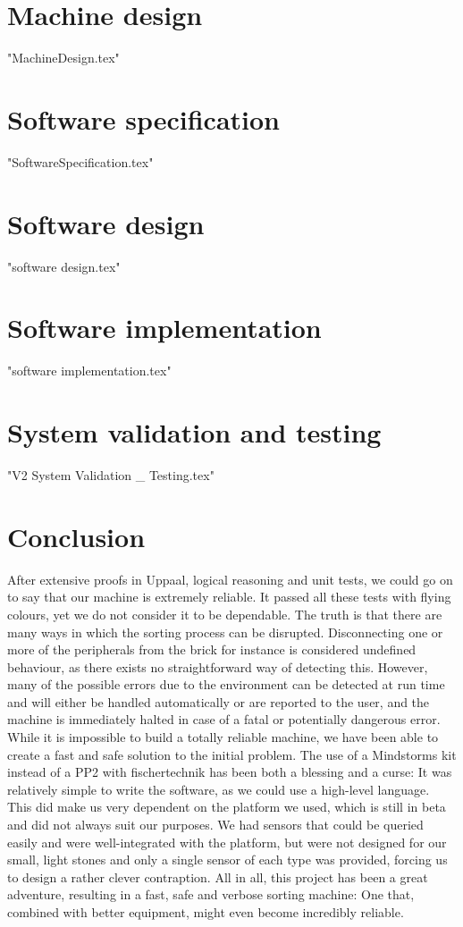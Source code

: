 \documentclass[a4paper,oneside,11pt]{report}
\begin{document}
\chapter{Machine design}
{"MachineDesign.tex"} 

\chapter{Software specification}
{"SoftwareSpecification.tex"}

\chapter{Software design}
{"software design.tex"}

\chapter{Software implementation}
{"software implementation.tex"} 

\chapter{System validation and testing}
{"V2 System Validation _ Testing.tex"}

\chapter{Conclusion}
After extensive proofs in Uppaal, logical reasoning and unit tests, we could go on to say that our machine is extremely reliable. It passed all these tests with flying colours, yet we do not consider it to be dependable. The truth is that there are many ways in which the sorting process can be disrupted. Disconnecting one or more of the peripherals from the brick for instance is considered undefined behaviour, as there exists no straightforward way of detecting this. However, many of the possible errors due to the environment can be detected at run time and will either be handled automatically or are reported to the user, and the machine is immediately halted in case of a fatal or potentially dangerous error.
While it is impossible to build a totally reliable machine, we have been able to create a fast and safe solution to the initial problem. The use of a Mindstorms kit instead of a PP2 with fischertechnik has been both a blessing and a curse: It was relatively simple to write the software, as we could use a high-level language. This did make us very dependent on the platform we used, which is still in beta and did not always suit our purposes. We had sensors that could be queried easily and were well-integrated with the platform, but were not designed for our small, light stones and only a single sensor of each type was provided, forcing us to design a rather clever contraption.
All in all, this project has been a great adventure, resulting in a fast, safe and verbose sorting machine: One that, combined with better equipment, might even become incredibly reliable.
\end{document}
